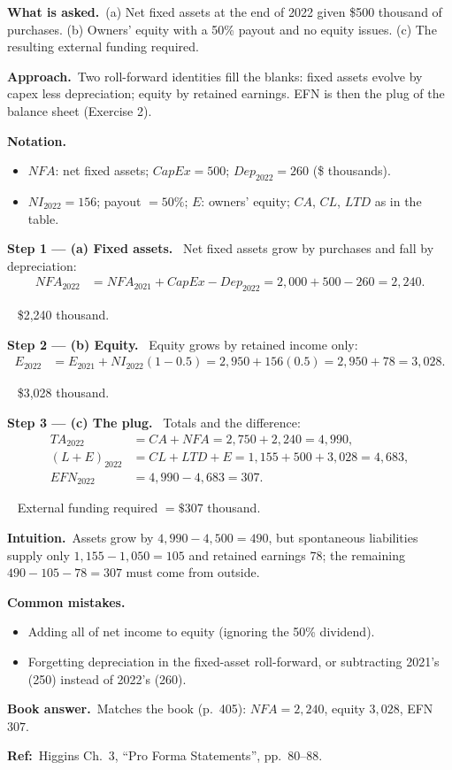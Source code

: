 \documentclass[11pt,a4paper]{article}
\newcommand{\notation}{\par\noindent\textbf{Notation.}}
\newcommand{\step}[2]{\par\medskip\noindent\textbf{Step #1 --- #2.}~}
\newcommand{\intuition}{\par\medskip\noindent\textbf{Intuition.}~}
\newcommand{\bookans}{\par\medskip\noindent\textbf{Book answer.}~}
\newcommand{\refbib}{\par\smallskip\noindent\textbf{Ref:}~}
\newcommand{\asked}{\par\medskip\noindent\textbf{What is asked.}~}
\newcommand{\approach}{\par\smallskip\noindent\textbf{Approach.}~}
\newcommand{\answer}[1]{\par\smallskip\noindent\fbox{\textbf{Answer #1.}}~}
\newcommand{\pitfalls}{\par\medskip\noindent\textbf{Common mistakes.}}
\newcommand{\EFN}{\mathit{EFN}}
\begin{document}
\asked (a) Net fixed assets at the end of 2022 given \$500 thousand of purchases. (b) Owners' equity
with a 50\% payout and no equity issues. (c) The resulting external funding required.

\approach Two roll-forward identities fill the blanks: fixed assets evolve by capex less depreciation;
equity by retained earnings. EFN is then the plug of the balance sheet (Exercise 2).

\notation
\begin{itemize}
  \item $NFA$: net fixed assets; $CapEx=500$; $Dep_{2022}=260$ (\$ thousands).
  \item $NI_{2022}=156$; payout $=50\%$; $E$: owners' equity; $CA$, $CL$, $LTD$ as in the table.
\end{itemize}

\step{1}{(a) Fixed assets} Net fixed assets grow by purchases and fall by depreciation:
\begin{align}
  NFA_{2022} &= NFA_{2021}+CapEx-Dep_{2022} = 2{,}000+500-260 = 2{,}240. \label{r2ce5-nfa}
\end{align}
\answer{(a)} \$2,240 thousand.

\step{2}{(b) Equity} Equity grows by retained income only:
\begin{align}
  E_{2022} &= E_{2021}+NI_{2022}(1-0.5) = 2{,}950+156(0.5) = 2{,}950+78 = 3{,}028. \label{r2ce5-eq}
\end{align}
\answer{(b)} \$3,028 thousand.

\step{3}{(c) The plug} Totals and the difference:
\begin{align}
  TA_{2022} &= CA+NFA = 2{,}750+2{,}240 = 4{,}990, \nonumber\\
  (L+E)_{2022} &= CL+LTD+E = 1{,}155+500+3{,}028 = 4{,}683, \nonumber\\
  \EFN_{2022} &= 4{,}990-4{,}683 = 307. \label{r2ce5-efn}
\end{align}
\answer{(c)} External funding required $=\$307$ thousand.

\intuition Assets grow by $4{,}990-4{,}500=490$, but spontaneous liabilities supply only
$1{,}155-1{,}050=105$ and retained earnings $78$; the remaining $490-105-78=307$ must come from outside.
\pitfalls
\begin{itemize}
  \item Adding all of net income to equity (ignoring the 50\% dividend).
  \item Forgetting depreciation in the fixed-asset roll-forward, or subtracting 2021's (250) instead of 2022's (260).
\end{itemize}
\bookans Matches the book (p.~405): $NFA=2{,}240$, equity $3{,}028$, EFN $307$.
\refbib{Higgins Ch.~3, ``Pro Forma Statements'', pp.~80--88.}
\end{document}
